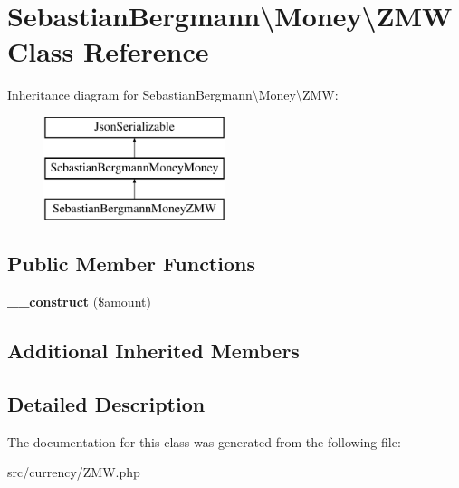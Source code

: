 \hypertarget{classSebastianBergmann_1_1Money_1_1ZMW}{}\section{Sebastian\+Bergmann\textbackslash{}Money\textbackslash{}Z\+M\+W Class Reference}
\label{classSebastianBergmann_1_1Money_1_1ZMW}
Inheritance diagram for Sebastian\+Bergmann\textbackslash{}Money\textbackslash{}Z\+M\+W\+:\begin{figure}[H]
\begin{center}
\leavevmode
\includegraphics[height=3.000000cm]{classSebastianBergmann_1_1Money_1_1ZMW}
\end{center}
\end{figure}
\subsection*{Public Member Functions}
\begin{DoxyCompactItemize}
\item 
\hypertarget{classSebastianBergmann_1_1Money_1_1ZMW_aea91215e318a2b00053e7ebebeb17fff}{}{\bfseries \+\_\+\+\_\+construct} (\$amount)\label{classSebastianBergmann_1_1Money_1_1ZMW_aea91215e318a2b00053e7ebebeb17fff}

\end{DoxyCompactItemize}
\subsection*{Additional Inherited Members}


\subsection{Detailed Description}


The documentation for this class was generated from the following file\+:\begin{DoxyCompactItemize}
\item 
src/currency/Z\+M\+W.\+php\end{DoxyCompactItemize}

